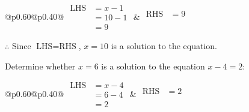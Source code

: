 \documentclass[12pt]{article}
\newcounter{minipagecount}
\begin{document}
\begin{multicols}{2}
\begin{minipage}[t]{0.40\textwidth}
    \noindent
    \renewcommand{\arraystretch}{1.3} %
    \begin{tabular}{@{}p{0.60\linewidth}@{}p{0.40\linewidth}@{}}
        \(\begin{aligned}
            \text{LHS} &= x - 1 \\
                    &= 10 - 1 \\
                    &= 9
        \end{aligned}\) &
        \(\begin{aligned}
            \text{RHS} &= 9\\
                    & \\
                    &
        \end{aligned}\)
    \end{tabular}
    \renewcommand{\arraystretch}{1.0} %
    \vspace{2pt}  %

    \noindent \(\therefore\) Since \(\text{LHS} = \text{RHS}\), \(x = 10\) is  a solution to the equation.

\end{minipage}

 \vspace*{16pt}
\noindent{(\theminipagecount)}\hspace{0.1mm} %
\begin{minipage}[t]{0.40\textwidth} %

    \noindent Determine whether \(x = 6\) is a solution to the equation \(x - 4 = 2\):
    \vspace{4pt}  %

    \noindent
    \renewcommand{\arraystretch}{1.3} %
    \begin{tabular}{@{}p{0.60\linewidth}@{}p{0.40\linewidth}@{}}
        \(\begin{aligned}
            \text{LHS} &= x - 4 \\
                    &= 6 - 4 \\
                    &= 2
        \end{aligned}\) &
        \(\begin{aligned}
            \text{RHS} &= 2\\
                    & \\
                    &
        \end{aligned}\)
    \end{tabular}
    \renewcommand{\arraystretch}{1.0} %
    \vspace{2pt}  %


\end{minipage}
\end{multicols}
\end{document}
